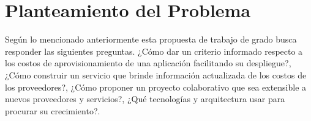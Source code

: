 
\chapter{Planteamiento del Problema} %

\label{ch:problema} %



Según lo mencionado anteriormente esta propuesta de trabajo de grado busca responder las siguientes preguntas. ¿Cómo dar un criterio informado respecto a los costos de aprovisionamiento de una aplicación facilitando su despliegue?, ¿Cómo construir un servicio que brinde información actualizada de los costos de los proveedores?, ¿Cómo proponer un proyecto colaborativo que sea extensible a nuevos proveedores y servicios?, ¿Qué tecnologías y arquitectura usar para procurar su crecimiento?.\bigskip
